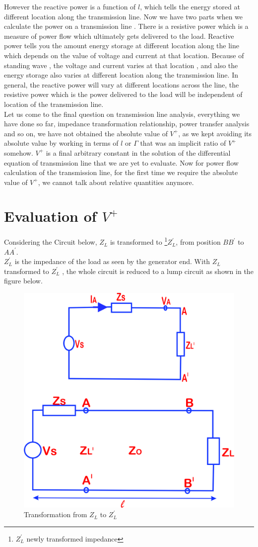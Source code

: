 However the reactive power is a function of $l$, which tells the energy stored at different location along the transmission line. Now we have two parts when we calculate the power on a transmission line . There is a resistive power which is a measure of power flow which ultimately gets delivered to the load. Reactive power tells you the amount energy storage at different location along the line which depends on the value of voltage and current at that location. Because of standing wave , the voltage and current varies at that location , and also the energy storage also varies at different location along the transmission line. In general, the reactive power will vary at different locations across the line, the resistive power which is the power delivered to the load will be independent of location of the transmission line.\\
Let us come to the final question on transmission line analysis, everything we have done so far, impedance transformation relationship, power transfer analysis and so on, we have not obtained the absolute value of $V^+$, as we kept avoiding its absolute value by working in terms of $l$ or $\Gamma$ that was an implicit ratio of $V^+$ somehow. $V^+$ is a final arbitrary constant in the solution of the differential equation of transmission line that we are yet to evaluate. Now for power flow calculation of the transmission line, for the first time we require the absolute value of $V^+$, we cannot talk about relative quantities anymore.

\section{Evaluation of \textbf{$ V ^ {+} $} } 
Considering the Circuit below, $Z_L$ is transformed to \footnote{$Z^{'}_L$ newly transformed impedance}$Z^{'}_L$, from position $BB^{'}$ to $AA^{'}$.\\
$Z^{'}_L$ is the impedance of the load as seen by the generator end. With $Z_L$ transformed to $Z^{'}_L$ , the whole circuit is reduced to a lump circuit as shown in the figure below.
\begin{figure}[h]
\centering
\includegraphics[width=0.5\linewidth]{./graphics/qwerrtt}
\caption{Transformation from $Z_L$ to $Z_{L}^'$}
\label{fig:qwerrtt}
\end{figure}

